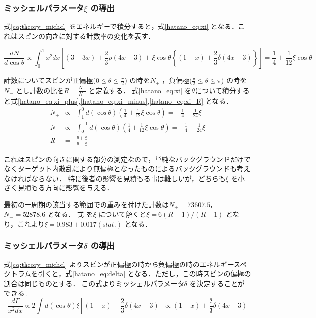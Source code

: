 \subsubsection{ミッシェルパラメータ$\xi$ の導出}
式\eqref{eq:theory_michel} をエネルギーで積分すると，式\eqref{hatano_eq:xi} となる．これはスピンの向きに対する計数率の変化を表す．

\begin{equation}
  \frac{dN}{d\cos\theta} \propto \int^1_0 x^2dx\left[ (3-3x) + \frac{2}{3}\rho(4x-3) + \xi\cos\theta\left\{ (1-x) + \frac{2}{3}\delta(4x-3) \right\}\right] = \frac{1}{4} + \frac{1}{12}\xi\cos\theta
  \label{hatano_eq:xi}
\end{equation}

計数についてスピンが正偏極($0\leq\theta\leq\frac{\pi}{2}$) の時を$N_+$ ，負偏極($\frac{\pi}{2}\leq\theta\leq\pi$) の時を$N_-$ とし計数の比を$R=\frac{N_+}{N_-}$ と定義する．
式\eqref{hatano_eq:xi} を$\theta$について積分すると式\eqref{hatano_eq:xi_plus},\eqref{hatano_eq:xi_minus},\eqref{hatano_eq:xi_R} となる．
\begin{eqnarray}
  N_+ & \propto & \int^0_1 d(\cos\theta) \left(\frac{1}{4} + \frac{1}{12}\xi\cos\theta\right)=-\frac{1}{4}-\frac{1}{24}\xi \label{hatano_eq:xi_plus} \\
  N_- & \propto & \int^{-1}_0 d(\cos\theta) \left(\frac{1}{4} + \frac{1}{12}\xi\cos\theta\right)=-\frac{1}{4}+\frac{1}{24}\xi \label{hatano_eq:xi_minus} \\
  R  & = & \frac{6+\xi}{6-\xi} \label{hatano_eq:xi_R}
\end{eqnarray}

これはスピンの向きに関する部分の測定なので，単純なバックグラウンドだけでなくターゲット内散乱により無偏極となったものによるバックグラウンドも考えなければならない．
特に後者の影響を見積もる事は難しいが，どちらも$\xi$ を小さく見積もる方向に影響を与える．

最初の一周期の該当する範囲での重みを付けた計数は$N_+=73607.5$，$N_-=52878.6$ となる．
式\label{hatano_eq:xi_ratio} を$\xi$ について解くと$\xi=6(R-1) / (R+1)$ となり，これより$\xi=0.983\pm0.017 (stat.)$ となる．

\subsubsection{ミッシェルパラメータ$\delta$ の導出}
式\eqref{eq:theory_michel} よりスピンが正偏極の時から負偏極の時のエネルギースペクトラムを引くと，式\eqref{hatano_eq:delta} となる．ただし，この時スピンの偏極の割合は同じものとする．
この式よりミッシェルパラメータ$\delta$ を決定することができる．
\begin{equation}
  \frac{d\Gamma}{x^2dx} \propto 2 \int d(\cos\theta) \xi \left[ (1-x) + \frac{2}{3}\delta(4x-3) \right] \propto (1-x) + \frac{2}{3}\delta(4x-3)
  \label{hatano_eq:delta}
\end{equation}


